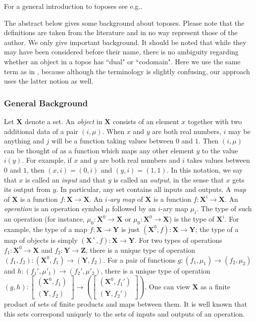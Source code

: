 \documentclass[a4paper,reqno,oneside]{article}
\begin{document}
For a general introduction to toposes see e.g.\~\cite{DubucReitberg2012,Johnstone2008}.


The abstract below gives some background about toposes. Please note that the definitions are taken from the literature and in no way represent those of the author. We only give important background. It should be noted that while they may have been considered before their name, there is no ambiguity regarding whether an object in a topos has ``dual" or ``codomain". Here we use the same term as in \cite{DubucReitberg2012}, because although the terminology is slightly confusing, our approach uses the latter notion as well.

\subsubsection*{General Background}

Let $\mathbf{X}$ denote a set. An \textit{object} in $\mathbf{X}$ consists of an element $x$ together with two additional data of a pair $(i,\mu)$. When $x$ and $y$ are both real numbers, $i$ may be anything and $j$ will be a function taking values between $0$ and $1$. Then $(i,\mu)$ can be thought of as a function which maps any other element $y$ to the value $i(y)$. For example, if $x$ and $y$ are both real numbers and $i$ takes values between $0$ and $1$, then $(x,i)=(0,i)$ and $(y,i)=(1,1)$. In this notation, we say that $x$ is called an \textit{input} and that $y$ is called an \textit{output}, in the sense that $x$ gets its output from $y$. In particular, any set contains all inputs and outputs. A \textit{map} of $\mathbf{X}$ is a function $f:\mathbf{X}\to\mathbf{X}$. An \textit{$i$-ary map} of $\mathbf{X}$ is a function $f:\mathbf{X}^{i}\to\mathbf{X}$. An \textit{operation} is an operation symbol $\mu$ followed by an $i$-ary map $\mu_i$. The type of such an operation (for instance, $\mu_{0}:\mathbf{X}^{0}\to\mathbf{X}$ or $\mu_0:\mathbf{X}^{0}\to\mathbf{X}$) is the type of $\mathbf{X}^{i}$. For example, the type of a map $f:\mathbf{X}\to\mathbf{Y}$ is just $(\mathbf{X}^{0},f):\mathbf{X}\to\mathbf{Y}$; the type of a map of objects is simply $(\mathbf{X}^{\times},f):\mathbf{X}\to\mathbf{Y}$. For two types of operations $f_1:\mathbf{X}^{0}\to\mathbf{X}$ and $f_2:\mathbf{Y}\to\mathbf{Z}$, there is a unique type of operation $(f_1,f_2):(\mathbf{X}^{0},f_1)\to(\mathbf{Y},f_2)$. For a pair of functions $g:(f_1,\mu_1)\to (f_2,\mu_2)$ and $h:(f_1',\mu'_1)\to (f_2',\mu'_2)$, there is a unique type of operation $(g,h):\begin{bmatrix} (\mathbf{X}^{0},f_1) \\(\mathbf{Y},f_2) \end{bmatrix}\to(\begin{bmatrix} (\mathbf{X}^{0},f_1') \\(\mathbf{Y},f_2')\end{bmatrix})$. One can view $\mathbf{X}$ as a finite product of sets of finite products and maps between them. It is well known that this sets correspond uniquely to the sets of inputs and outputs of an operation.
\end{document}
